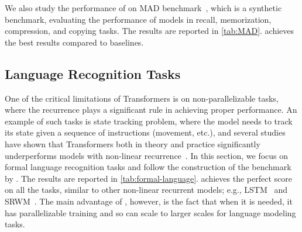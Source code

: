 We also study the performance of \model{} on MAD benchmark~\citep{poli2024mechanistic}, which is a synthetic benchmark, evaluating the performance of models in recall, memorization, compression, and copying tasks. The results are reported in \autoref{tab:MAD}. \model{} achieves the best results compared to baselines. 







\subsection{Language Recognition Tasks}\label{sec:exp-language}
One of the critical limitations of Transformers is on non-parallelizable tasks, where the recurrence plays a significant rule in achieving proper performance. An example of such tasks is state tracking problem, where the model needs to track its state given a sequence of instructions (movement, etc.), and several studies have shown that Transformers both in theory and practice significantly underperforms models with non-linear recurrence~\citep{merrill2024the, grazzi2025unlocking}. In this section, we focus on formal language recognition tasks and follow the construction of the benchmark by \citet{irie2023practical}. The results are reported in \autoref{tab:formal-language}. \model{} achieves the perfect score on all the tasks, similar to other non-linear recurrent models; e.g., LSTM~\cite{LSTM} and SRWM~\citep{irie2022modern}. The main advantage of \model, however, is the fact that when it is needed, it has parallelizable training and so can scale to larger scales for language modeling tasks.  













